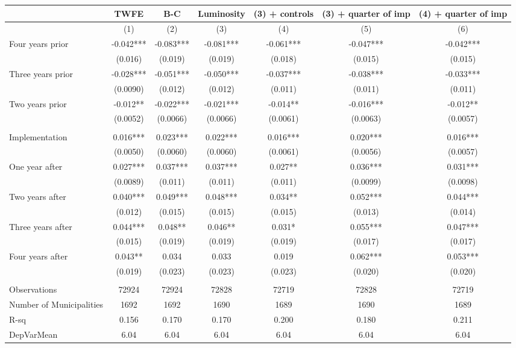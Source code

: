 \begin{tabular}{lcccccc}
\toprule
      & TWFE  & B-C   & Luminosity & (3) + controls & (3) + quarter of imp & (4) + quarter of imp \\
\midrule
      & (1)   & (2)   & (3)   & (4)   & (5)   & (6) \\
\midrule
\midrule
Four years prior & -0.042*** & -0.083*** & -0.081*** & -0.061*** & -0.047*** & -0.042*** \\
      & (0.016) & (0.019) & (0.019) & (0.018) & (0.015) & (0.015) \\
Three years prior & -0.028*** & -0.051*** & -0.050*** & -0.037*** & -0.038*** & -0.033*** \\
      & (0.0090) & (0.012) & (0.012) & (0.011) & (0.011) & (0.011) \\
Two years prior & -0.012** & -0.022*** & -0.021*** & -0.014** & -0.016*** & -0.012** \\
      & (0.0052) & (0.0066) & (0.0066) & (0.0061) & (0.0063) & (0.0057) \\
      &       &       &       &       &       &  \\
Implementation & 0.016*** & 0.023*** & 0.022*** & 0.016*** & 0.020*** & 0.016*** \\
      & (0.0050) & (0.0060) & (0.0060) & (0.0061) & (0.0056) & (0.0057) \\
One year after & 0.027*** & 0.037*** & 0.037*** & 0.027** & 0.036*** & 0.031*** \\
      & (0.0089) & (0.011) & (0.011) & (0.011) & (0.0099) & (0.0098) \\
Two years after & 0.040*** & 0.049*** & 0.048*** & 0.034** & 0.052*** & 0.044*** \\
      & (0.012) & (0.015) & (0.015) & (0.015) & (0.013) & (0.014) \\
Three years after & 0.044*** & 0.048** & 0.046** & 0.031* & 0.055*** & 0.047*** \\
      & (0.015) & (0.019) & (0.019) & (0.019) & (0.017) & (0.017) \\
Four years after & 0.043** & 0.034 & 0.033 & 0.019 & 0.062*** & 0.053*** \\
      & (0.019) & (0.023) & (0.023) & (0.023) & (0.020) & (0.020) \\
      &       &       &       &       &       &  \\
\midrule
Observations & 72924 & 72924 & 72828 & 72719 & 72828 & 72719 \\
Number of Municipalities & 1692  & 1692  & 1690  & 1689  & 1690  & 1689 \\
R-sq  & 0.156 & 0.170 & 0.170 & 0.200 & 0.180 & 0.211 \\
DepVarMean & 6.04  & 6.04  & 6.04  & 6.04  & 6.04  & 6.04 \\
\bottomrule
\bottomrule
\end{tabular}%
